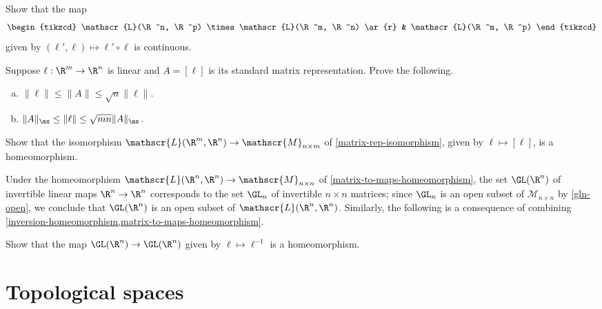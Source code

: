 \begin{exercise} \label{composition-continuous}
	Show that the map
	\[ \begin{tikzcd} \mathscr{L}(\R^n, \R^p) \times \mathscr{L}(\R^m, \R^n) \ar{r} & \mathscr{L}(\R^m, \R^p) \end{tikzcd} \]
	given by $(\ell', \ell) \mapsto \ell' \circ \ell$ is continuous.
\end{exercise}

\begin{exercise}
	Suppose $\ell : \R^m \to \R^n$ is linear and $A = [\ell]$ is its standard matrix representation. Prove the following. 
	\begin{enumerate}[(a)]
		\item $\|\ell\| \leq \|A\| \leq \sqrt{n} \|\ell\|$. 
		\item $\|A \|_\mx \leq \|\ell\| \leq \sqrt{mn} \|A\|_\mx$. 
	\end{enumerate}
\end{exercise}


\begin{exercise} \label{matrix-to-maps-homeomorphism}
	Show that the isomorphism $\mathscr{L}(\R^m, \R^n) \to \mathscr{M}_{n \times m}$ of \cref{matrix-rep-isomorphism}, given by $\ell \mapsto [\ell]$, is a homeomorphism. 
\end{exercise}

Under the homeomorphism $\mathscr{L}(\R^n, \R^n) \to \mathscr{M}_{n \times n}$ of \cref{matrix-to-maps-homeomorphism}, the set $\GL(\R^n)$ of invertible linear maps $\R^n \to \R^n$ corresponds to the set $\GL_n$ of invertible $n \times n$ matrices; since $\GL_n$ is an open subset of $\mathscr{M}_{n \times n}$ by  \cref{gln-open}, we conclude that $\GL(\R^n)$ is an open subset of $\mathscr{L}(\R^n, \R^n)$. Similarly, the following is a consequence of combining \cref{inversion-homeomorphism,matrix-to-maps-homeomorphism}. 

\begin{exercise} \label{inversion-homeomorphism-maps}
	Show that the map $\GL(\R^n) \to \GL(\R^n)$ given by $\ell \mapsto  \ell^{-1}$ is a homeomorphism. 
\end{exercise}

\section{Topological spaces} \label{topological-spaces}

